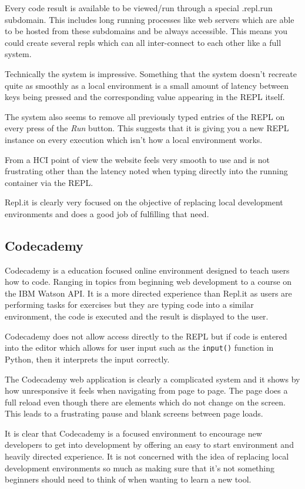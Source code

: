 Every code result is available to be viewed/run through a special .repl.run subdomain. This includes long running processes like web servers which are able to be hosted from these subdomains and be always accessible. This means you could create several repls which can all inter-connect to each other like a full system.

Technically the system is impressive. Something that the system doesn't recreate quite as smoothly as a local environment is a small amount of latency between keys being pressed and the corresponding value appearing in the REPL itself.

The system also seems to remove all previously typed entries of the REPL on every press of the \textit{Run} button. This suggests that it is giving you a new REPL instance on every execution which isn't how a local environment works.

From a HCI point of view the website feels very smooth to use and is not frustrating other than the latency noted when typing directly into the running container via the REPL.

Repl.it is clearly very focused on the objective of replacing local development environments and does a good job of fulfilling that need.

\subsection{Codecademy}
Codecademy is a education focused online environment designed to teach users how to code. Ranging in topics from beginning web development to a course on the IBM Watson API. It is a more directed experience than Repl.it as users are performing tasks for exercises but they are typing code into a similar environment, the code is executed and the result is displayed to the user.

Codecademy does not allow access directly to the REPL but if code is entered into the editor which allows for user input such as the \texttt{input()} function in Python, then it interprets the input correctly.

The Codecademy web application is clearly a complicated system and it shows by how unresponsive it feels when navigating from page to page. The page does a full reload even though there are elements which do not change on the screen. This leads to a frustrating pause and blank screens between page loads.

It is clear that Codecademy is a focused environment to encourage new developers to get into development by offering an easy to start environment and heavily directed experience. It is not concerned with the idea of replacing local development environments so much as making sure that it's not something beginners should need to think of when wanting to learn a new tool.

